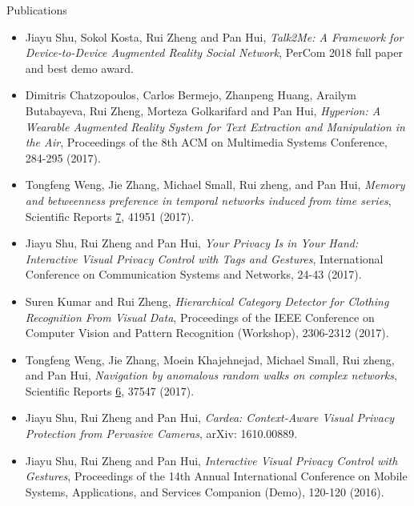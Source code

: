\documentclass{resume} %
\begin{document}
\begin{rSection}{Publications}

\begin{itemize}[label=\raisebox{0.25ex}{\tiny\JackStarBold}]
\item Jiayu Shu, Sokol Kosta, Rui Zheng and Pan Hui, \emph{Talk2Me: A Framework for Device-to-Device Augmented Reality Social Network}, \textsf{PerCom 2018 full paper and best demo award}.

\item Dimitris Chatzopoulos, Carlos Bermejo, Zhanpeng Huang, Arailym Butabayeva, Rui Zheng, Morteza Golkarifard and Pan Hui, \emph{Hyperion: A Wearable Augmented Reality System for Text Extraction and Manipulation in the Air}, \textsf{Proceedings of the 8th ACM on Multimedia Systems Conference}, 284-295 (2017).

\item Tongfeng Weng, Jie Zhang, Michael Small, Rui zheng, and Pan Hui, \emph{Memory and betweenness preference in temporal networks induced from time series}, \textsf{Scientific Reports} \underline{7}, 41951 (2017).

\item Jiayu Shu, Rui Zheng and Pan Hui, \emph{Your Privacy Is in Your Hand: Interactive Visual Privacy Control with Tags and Gestures}, \textsf{International Conference on Communication Systems and Networks}, 24-43 (2017).

\item Suren Kumar and Rui Zheng, \emph{Hierarchical Category Detector for Clothing Recognition From Visual Data}, \textsf{Proceedings of the IEEE Conference on Computer Vision and Pattern Recognition (Workshop)}, 2306-2312 (2017).

\item Tongfeng Weng, Jie Zhang, Moein Khajehnejad, Michael Small, Rui zheng, and Pan Hui, \emph{Navigation by anomalous random walks on complex networks}, \textsf{Scientific Reports} \underline{6}, 37547 (2017). %

\item Jiayu Shu, Rui Zheng and Pan Hui, \emph{Cardea: Context-Aware Visual Privacy Protection from Pervasive Cameras}, \textsf{arXiv: 1610.00889}.%

\item Jiayu Shu, Rui Zheng and Pan Hui, \emph{Interactive Visual Privacy Control with Gestures}, \textsf{Proceedings of the 14th Annual International Conference on Mobile Systems, Applications, and Services Companion (Demo)}, 120-120 (2016).%


\end{itemize}
\end{rSection}
\end{document}
